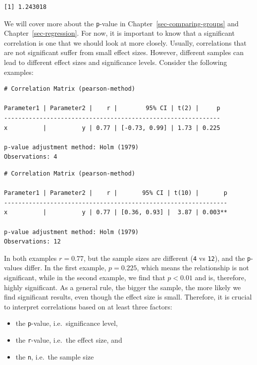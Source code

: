 \documentclass[
  letterpaper,
]{krantz}
\begin{document}
\begin{verbatim}
[1] 1.243018
\end{verbatim}

We will cover more about the \texttt{p}-value in
Chapter~\ref{sec-comparing-groups} and Chapter~\ref{sec-regression}. For
now, it is important to know that a significant correlation is one that
we should look at more closely. Usually, correlations that are not
significant suffer from small effect sizes. However, different samples
can lead to different effect sizes and significance levels. Consider the
following examples:

\begin{verbatim}
# Correlation Matrix (pearson-method)

Parameter1 | Parameter2 |    r |        95% CI | t(2) |     p
-------------------------------------------------------------
x          |          y | 0.77 | [-0.73, 0.99] | 1.73 | 0.225

p-value adjustment method: Holm (1979)
Observations: 4
\end{verbatim}

\begin{verbatim}
# Correlation Matrix (pearson-method)

Parameter1 | Parameter2 |    r |       95% CI | t(10) |       p
---------------------------------------------------------------
x          |          y | 0.77 | [0.36, 0.93] |  3.87 | 0.003**

p-value adjustment method: Holm (1979)
Observations: 12
\end{verbatim}

In both examples \(r = 0.77\), but the sample sizes are different
(\texttt{4} vs \texttt{12}), and the \texttt{p}-values differ. In the
first example, \(p = 0.225\), which means the relationship is not
significant, while in the second example, we find that \(p < 0.01\) and
is, therefore, highly significant. As a general rule, the bigger the
sample, the more likely we find significant results, even though the
effect size is small. Therefore, it is crucial to interpret correlations
based on at least three factors:

\begin{itemize}
\item
  the \texttt{p}-value, i.e.~significance level,
\item
  the \texttt{r}-value, i.e.~the effect size, and
\item
  the \texttt{n}, i.e.~the sample size
\end{itemize}
\end{document}
